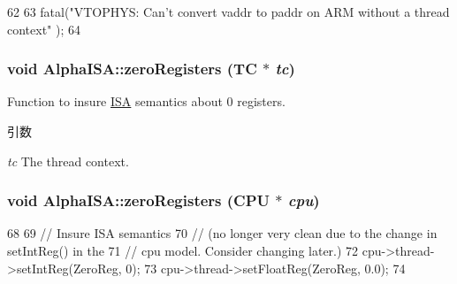 \begin{DoxyCode}
62 {
63     fatal("VTOPHYS: Can't convert vaddr to paddr on ARM without a thread context"
      );
64 }
\end{DoxyCode}
\hypertarget{namespaceAlphaISA_ae69d09a8a385eb3239db7d28788f9f3f}{
\subsubsection[{zeroRegisters}]{\setlength{\rightskip}{0pt plus 5cm}void AlphaISA::zeroRegisters (TC $\ast$ {\em tc})}}
\label{namespaceAlphaISA_ae69d09a8a385eb3239db7d28788f9f3f}
Function to insure \hyperlink{classAlphaISA_1_1ISA}{ISA} semantics about 0 registers. 
\begin{DoxyParams}{引数}
\item[{\em tc}]The thread context. \end{DoxyParams}
\hypertarget{namespaceAlphaISA_ac1e586c013057b642701d473139aa444}{
\subsubsection[{zeroRegisters}]{\setlength{\rightskip}{0pt plus 5cm}void AlphaISA::zeroRegisters (CPU $\ast$ {\em cpu})}}
\label{namespaceAlphaISA_ac1e586c013057b642701d473139aa444}



\begin{DoxyCode}
68 {
69     // Insure ISA semantics
70     // (no longer very clean due to the change in setIntReg() in the
71     // cpu model.  Consider changing later.)
72     cpu->thread->setIntReg(ZeroReg, 0);
73     cpu->thread->setFloatReg(ZeroReg, 0.0);
74 }
\end{DoxyCode}


